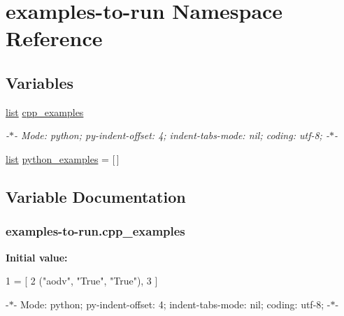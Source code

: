 \hypertarget{namespaceexamples-to-run}{}\section{examples-\/to-\/run Namespace Reference}
\label{namespaceexamples-to-run}
\subsection*{Variables}
\begin{DoxyCompactItemize}
\item 
\hyperlink{openflow-interface_8h_afd9bcfa176617760671b67580f536fa7}{list} \hyperlink{namespaceexamples-to-run_a72faa45e2d956385ab9962e8e63cf5ef}{cpp\+\_\+examples}
\begin{DoxyCompactList}\small\item\em -\/$\ast$-\/ Mode\+: python; py-\/indent-\/offset\+: 4; indent-\/tabs-\/mode\+: nil; coding\+: utf-\/8; -\/$\ast$-\/ \end{DoxyCompactList}\item 
\hyperlink{openflow-interface_8h_afd9bcfa176617760671b67580f536fa7}{list} \hyperlink{namespaceexamples-to-run_a75df1bf80cc7697c5141aa53ab404bd2}{python\+\_\+examples} = \mbox{[}$\,$\mbox{]}
\end{DoxyCompactItemize}


\subsection{Variable Documentation}
\subsubsection[{\texorpdfstring{cpp\+\_\+examples}{cpp_examples}}]{ examples-\/to-\/run.\+cpp\+\_\+examples}\hypertarget{namespaceexamples-to-run_a72faa45e2d956385ab9962e8e63cf5ef}{}\label{namespaceexamples-to-run_a72faa45e2d956385ab9962e8e63cf5ef}
{\bfseries Initial value\+:}
\begin{DoxyCode}
1 = [
2     (\textcolor{stringliteral}{"aodv"}, \textcolor{stringliteral}{"True"}, \textcolor{stringliteral}{"True"}),
3 ]
\end{DoxyCode}


-\/$\ast$-\/ Mode\+: python; py-\/indent-\/offset\+: 4; indent-\/tabs-\/mode\+: nil; coding\+: utf-\/8; -\/$\ast$-\/ 

